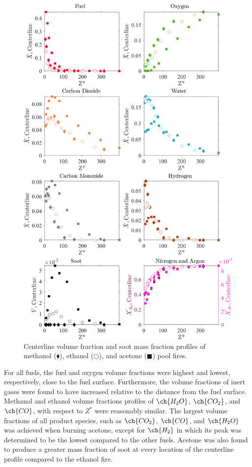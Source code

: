 \documentclass[12pt]{article}
\begin{document}
\begin{figure}[!]
	\centering
\includegraphics[width=12.5cm,keepaspectratio]{OVERALL_Fuel_Comparison.png}
	\caption[Major Species Comparison]{Centerline volume fraction and soot mass fraction profiles of methanol ($\blacklozenge$), ethanol ($\bigcirc$), and acetone ($\blacksquare$) pool fires.}
	\label{fig:Fuel_Comparison}
\end{figure}

For all fuels, the fuel and oxygen volume fractions were highest and lowest, respectively, close to the fuel surface. Furthermore, the volume fractions of inert gases were found to have increased relative to the distance from the fuel surface. Methanol and ethanol volume fractions profiles of $\ch{H_{2}O}$, $\ch{CO_{2}}$, and $\ch{CO}$, with respect to $Z^{*}$ were reasonably similar. The largest volume fractions of all product species, such as $\ch{CO_2}$, $\ch{CO}$, and $\ch{H_2O}$ was achieved when burning acetone, except for $\ch{H_{2}}$ in which its peak was determined to be the lowest compared to the other fuels. Acetone was also found to produce a greater mass fraction of soot at every location of the centerline profile compared to the ethanol fire.
\end{document}
